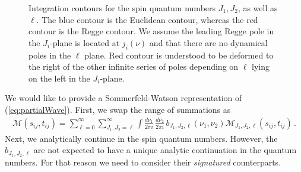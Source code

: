 \begin{figure}[t!]
\begin{subfigure}[]{0.5\textwidth}
{\begin{tikzpicture}

      \end{tikzpicture}
    }
  \end{subfigure}
  \caption{Integration contours for the spin quantum numbers $J_1,J_2$,  as well as $ \ell$.
    The blue contour is the Euclidean contour, whereas the red contour is the Regge contour.
    We assume the leading Regge pole in the $J_i$-plane is located at $j_i(\nu)$ and that there are no
    dynamical poles in the $\ell$ plane. 
    Red contour is understood to be deformed to the right of the other infinite series of poles depending on $ \ell $ lying on the left in the $J_i$-plane.
  }
  \label{fig:contourDeformationJ1J2}
\end{figure}

We would like to provide a Sommerfeld-Watson representation of (\ref{eq:partialWave}).
First, we swap the range of summations as
\begin{align}
  \mathcal{M}(s_{ij},t_{ij} )
  = \sum_{\ell=0}^{ \infty}
  \sum_{J_1,J_2=\ell}^{\infty}
  \int \frac{d \nu_1}{2\pi i}\,\frac{d \nu_2}{2\pi i}\, b_{J_1,J_2,\ell}(\nu_1,\nu_2)
  \mathcal{M}_{J_1,J_2,\ell}(s_{ij},t_{ij})
  \,.
  \label{eq:partialWaveSwapped}
\end{align}
Next, we   analytically continue in the spin quantum numbers.
However, the $ b_{J_1,J_2,\ell} $ are not expected to have a unique
analytic  continuation in   the quantum numbers. For that reason we need to consider
their    \textit{signatured} counterparts.

